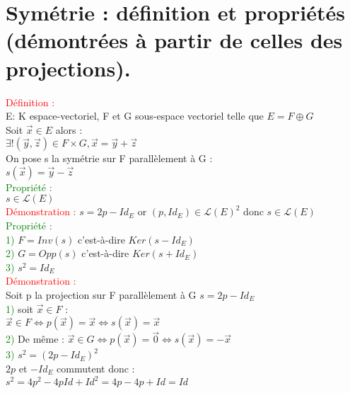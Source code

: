 \documentclass{article}
\begin{document}
\section{Symétrie : définition et propriétés (démontrées à partir de celles des projections).}
\textcolor{red}{Définition :} \\ 
E: K espace-vectoriel, F et G sous-espace vectoriel telle que $E= F \oplus G$ \\ 
Soit $\vec{x} \in E$ alors : \\ 
$\exists!(\vec{y},\vec{z}) \in F \times G, \vec{x}=\vec{y}+ \vec{z}$ \\ 
On pose s la symétrie sur F parallèlement à G : \\
$s(\vec{x})=\vec{y}-\vec{z}$ \\ 
\textcolor{green}{Propriété :} \\ 
$s \in \mathcal{L}(E)$ \\ 
\textcolor{red}{Démonstration :}
$s=2p- Id_E$ or $(p,Id_E) \in \mathcal{L}(E)^2$ donc $s\in \mathcal{L}(E)$ \\
\textcolor{green}{Propriété :} \\ 
\textcolor{green}{1)} $F=Inv(s)$ c'est-à-dire $Ker(s-Id_E)$ \\ 
\textcolor{green}{2)} $G=Opp(s)$ c'est-à-dire $Ker (s+Id_E)$ \\ 
\textcolor{green}{3)} $s^2=Id_E$ \\ 
\textcolor{red}{Démonstration :} \\
Soit p la projection sur F parallèlement à G $s=2p-Id_E$ \\ 
\textcolor{green}{1)} soit $\vec{x} \in F$ : \\ 
$\vec{x} \in F \Leftrightarrow p(\vec{x})=\vec{x} \Leftrightarrow s(\vec{x})= \vec x$ \\ 
\textcolor{green}{2)} De même : $\vec{x} \in G \Leftrightarrow p( \vec{x}) =\vec{0} \Leftrightarrow s(\vec{x})=-\vec{x}$ \\ 
\textcolor{green}{3)} $s^2=(2p-Id_E)^2$ \\ 
$2p$ et $-Id_E$ commutent donc : \\ 
$s^2=4p^2-4pId+Id^2=4p-4p+Id=Id$ \\ 
\end{document}
